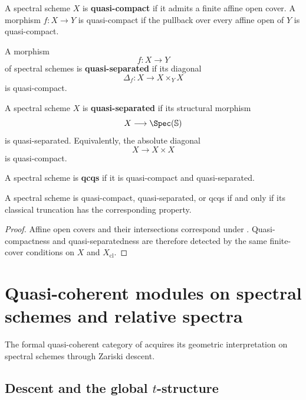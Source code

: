 \begin{definition}
\label{def:quasi-compact-spectral-scheme}
A spectral scheme $X$ is \textbf{quasi-compact} if it admits a finite
affine open cover. A morphism $f:X\to Y$ is quasi-compact if the pullback
over every affine open of $Y$ is quasi-compact.
\end{definition}

\begin{definition}
\label{def:quasi-separated-spectral-scheme}
A morphism
\[
    f
    \colon
    X
    \longrightarrow
    Y
\]
of spectral schemes is \textbf{quasi-separated} if its diagonal
\[
    \Delta_f
    \colon
    X
    \longrightarrow
    X\times_YX
\]
is quasi-compact.

A spectral scheme $X$ is \textbf{quasi-separated} if its structural
morphism
\[
    X
    \longrightarrow
    \Spec(\mathbb S)
\]
is quasi-separated. Equivalently, the absolute diagonal
\[
    X
    \longrightarrow
    X\times X
\]
is quasi-compact.

A spectral scheme is \textbf{qcqs} if it is quasi-compact and
quasi-separated.
\end{definition}

\begin{proposition}
\label{prop:classical-detection-qcqs}
A spectral scheme is quasi-compact, quasi-separated, or qcqs if and only
if its classical truncation has the corresponding property.
\end{proposition}

\begin{proof}
Affine open covers and their intersections correspond under
. Quasi-compactness and
quasi-separatedness are therefore detected by the same finite-cover
conditions on $X$ and $X_{\mathrm{cl}}$.
\end{proof}

\section{Quasi-coherent modules on spectral schemes and relative spectra}
\label{sec:qcoh-spectral-schemes-relative-spec}

The formal quasi-coherent category of
 acquires its geometric interpretation on
spectral schemes through Zariski descent.

\subsection{Descent and the global \texorpdfstring{$t$}{t}-structure}

